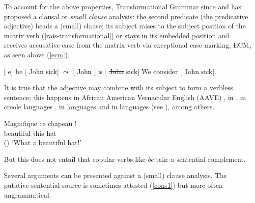 To account for the above properties, Transformational Grammar since \citet{Stowell1983}
and \citet[Chapter~4]{Chomsky1986} has proposed a clausal or \emph{small clause} analysis: the second predicate
(the predicative adjective) heads a (small) clause; its subject raises to the subject position of the
matrix verb (\ref{rais-transformational}) or stays in its embedded position and receives accusative case from
the matrix verb via exceptional case marking, ECM, as seen above (\ref{ecm}).


\eal
\ex
\label{rais-transformational}
{}[ e] be [ John sick] $\leadsto$  [ John ] is  [ \st{John} sick]
\ex
\label{ecm}
We consider [ John sick].
\zl

It is true that the adjective may combine with its subject to form a verbless sentence; this happens
in African American Vernacular English (AAVE)
\citep{Bender2001a},
in  \citep{Laurens2008},
in creole languages
\citep[134]{HenriandAbeille2007}, in  languages \citep[]{Stassen1997} and in
 languages (see \citealp[20--26]{AlotaibiBorsley2020a-u}), among others. 

\ea
\gll Magnifique ce chapeau !\\
     beautiful this hat\\\hfill{()}
\glt `What a beautiful hat!'
\z

\noindent
But this does not entail that copular verbs like \emph{be} take a sentential complement. 




Several arguments can be presented against a (small) clause
analysis. The putative sentential source is sometimes attested (\ref{cons1}) but more often
ungrammatical:
	
